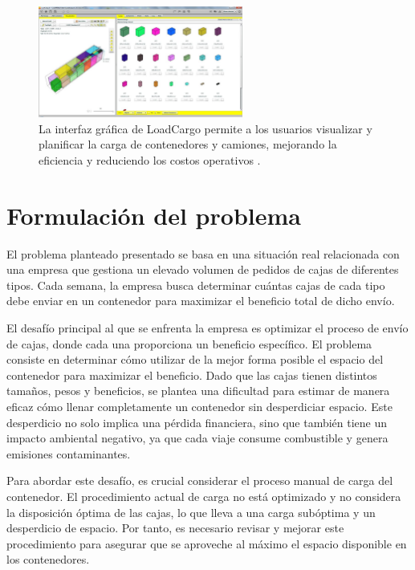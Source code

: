 \documentclass[openany]{article}
\begin{document}
\begin{figure}[H]
    \centering
    \includegraphics[width=0.6\textwidth]{Figures/loadcargo.jpg}
    \caption{La interfaz gráfica de LoadCargo permite a los usuarios visualizar y planificar la carga de contenedores y camiones, mejorando la eficiencia y reduciendo los costos operativos \parencite{loadcargo2024}.}
    \label{fig:loadcargo}
\end{figure}







\newpage



\section{Formulación del problema}
\label{sec:problem}

El problema planteado presentado se basa en una situación real relacionada con una empresa que gestiona un elevado volumen de pedidos de cajas de diferentes tipos. Cada semana, la empresa busca determinar cuántas cajas de cada tipo debe enviar en un contenedor para maximizar el beneficio total de dicho envío.

El desafío principal al que se enfrenta la empresa es optimizar el proceso de envío de cajas, donde cada una proporciona un beneficio específico. El problema consiste en determinar cómo utilizar de la mejor forma posible el espacio del contenedor para maximizar el beneficio. Dado que las cajas tienen distintos tamaños, pesos y beneficios, se plantea una dificultad para estimar de manera eficaz cómo llenar completamente un contenedor sin desperdiciar espacio. Este desperdicio no solo implica una pérdida financiera, sino que también tiene un impacto ambiental negativo, ya que cada viaje consume combustible y genera emisiones contaminantes.

Para abordar este desafío, es crucial considerar el proceso manual de carga del contenedor. El procedimiento actual de carga no está optimizado y no considera la disposición óptima de las cajas, lo que lleva a una carga subóptima y un desperdicio de espacio. Por tanto, es necesario revisar y mejorar este procedimiento para asegurar que se aproveche al máximo el espacio disponible en los contenedores.
\end{document}

